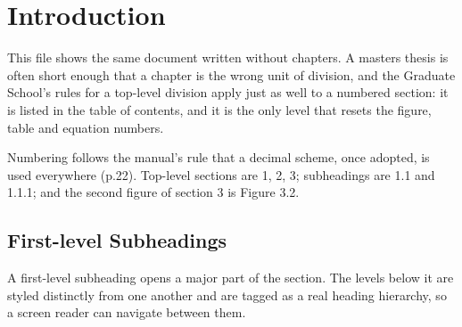 %
%
\ThesisSectionsOnly

\section{Introduction}

This file shows the same document written without chapters. A masters thesis
is often short enough that a chapter is the wrong unit of division, and the
Graduate School's rules for a top-level division apply just as well to a
numbered section: it is listed in the table of contents, and it is the only
level that resets the figure, table and equation numbers.

Numbering follows the manual's rule that a decimal scheme, once adopted, is
used everywhere (p.22). Top-level sections are 1, 2, 3; subheadings are 1.1
and 1.1.1; and the second figure of section 3 is Figure 3.2.

\subsection{First-level Subheadings}

A first-level subheading opens a major part of the section. The levels below
it are styled distinctly from one another and are tagged as a real heading
hierarchy, so a screen reader can navigate between them.

